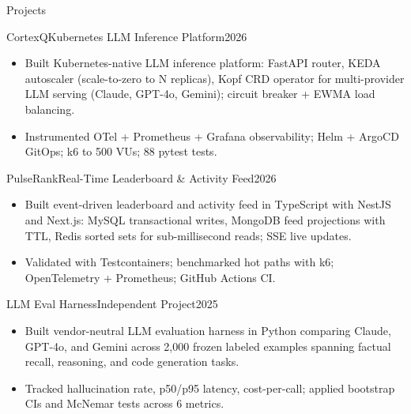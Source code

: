 \documentclass[]{mcdowellcv}
\begin{document}
\begin{cvsection}{Projects}
  \begin{cvsubsection}{CortexQ}{Kubernetes LLM Inference Platform}{2026}
    \begin{itemize}
      \item Built Kubernetes-native LLM inference platform: FastAPI router, KEDA autoscaler (scale-to-zero to N replicas), Kopf CRD operator for multi-provider LLM serving (Claude, GPT-4o, Gemini); circuit breaker + EWMA load balancing.
      \item Instrumented OTel + Prometheus + Grafana observability; Helm + ArgoCD GitOps; k6 to 500 VUs; 88 pytest tests.
    \end{itemize}
    \vspace{-1.5pt}
  \end{cvsubsection}

  \begin{cvsubsection}{PulseRank}{Real-Time Leaderboard \& Activity Feed}{2026}
    \begin{itemize}
      \item Built event-driven leaderboard and activity feed in TypeScript with NestJS and Next.js: MySQL transactional writes, MongoDB feed projections with TTL, Redis sorted sets for sub-millisecond reads; SSE live updates.
      \item Validated with Testcontainers; benchmarked hot paths with k6; OpenTelemetry + Prometheus; GitHub Actions CI.
    \end{itemize}
    \vspace{-1.5pt}
  \end{cvsubsection}

  \begin{cvsubsection}{LLM Eval Harness}{Independent Project}{2025}
    \begin{itemize}
      \item Built vendor-neutral LLM evaluation harness in Python comparing Claude, GPT-4o, and Gemini across 2,000 frozen labeled examples spanning factual recall, reasoning, and code generation tasks.
      \item Tracked hallucination rate, p50/p95 latency, cost-per-call; applied bootstrap CIs and McNemar tests across 6 metrics.
    \end{itemize}
  \end{cvsubsection}
\end{cvsection}
\end{document}
